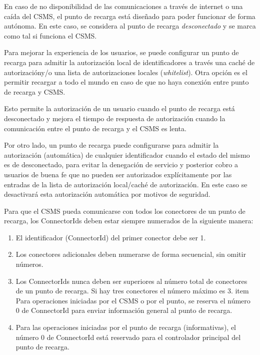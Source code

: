 \documentclass[12pt,a4paper,onecolumn,oneside]{report}
\newcounter{subsubsubsection}[subsubsection]
\begin{document}
En caso de no disponibilidad de las comunicaciones a través de internet o una caída del CSMS, el punto de recarga está diseñado para poder funcionar de forma autónoma. En este caso, se considera al punto de recarga \textit{desconectado} y se marca como tal si funciona el CSMS.

Para mejorar la experiencia de los usuarios, se puede configurar un punto de recarga para admitir la autorización local de identificadores a través una caché de autorizacióny/o una lista de autorizaciones locales (\textit{whitelist}). Otra opción es el permitir recargar a todo el mundo en caso de que no haya conexión entre punto de recarga y CSMS. 

Esto permite la autorización de un usuario cuando el punto de recarga está desconectado y mejora el tiempo de respuesta de autorización cuando la comunicación entre el punto de recarga y el CSMS es lenta.

Por otro lado, un punto de recarga puede configurarse para admitir la autorización (automática) de cualquier identificador cuando el estado del mismo es de desconectado, para evitar la denegación de servicio y posterior cobro a usuarios de buena fe que no pueden ser autorizados explícitamente por las entradas de la lista de autorización local/caché de autorización. En este caso se desactivará esta autorización automática por motivos de seguridad.


\label{Numeración de conectores}

Para que el CSMS pueda comunicarse con todos los conectores de un punto de recarga, los ConnectorIds deben estar siempre numerados de la siguiente manera:

\begin{enumerate}

\item El identificador (ConnectorId) del primer conector debe ser 1.
\item Los conectores adicionales deben numerarse de forma secuencial, sin omitir números.
\item Los ConnectorIds nunca deben ser superiores al número total de conectores de un punto de recarga. Si hay tres conectores el número máximo es 3.
item Para operaciones iniciadas por el CSMS o por el punto, se reserva el número 0 de ConnectorId para enviar información general al punto de recarga.
\item Para las operaciones iniciadas por el punto de recarga (informativas), el número 0 de ConnectorId está reservado para el controlador principal del punto de recarga.

\end{enumerate}
\end{document}
